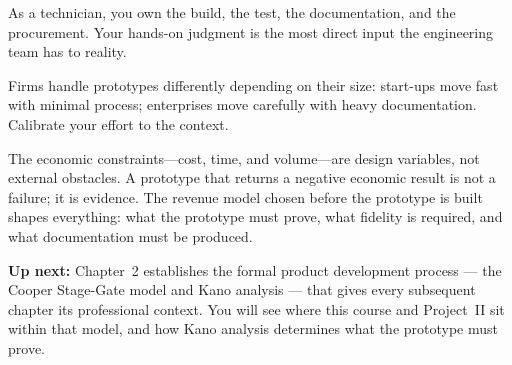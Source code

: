 As a technician, you own the build, the test, the documentation, and the
procurement.
Your hands-on judgment is the most direct input the engineering team has
to reality.

Firms handle prototypes differently depending on their size: start-ups
move fast with minimal process; enterprises move carefully with heavy
documentation.
Calibrate your effort to the context.

The economic constraints---cost, time, and volume---are design variables,
not external obstacles.
A prototype that returns a negative economic result is not a failure; it
is evidence.
The revenue model chosen before the prototype is built shapes everything:
what the prototype must prove, what fidelity is required, and what
documentation must be produced.

\medskip

\noindent\textbf{Up next:} Chapter~2 establishes the formal product development process --- the Cooper Stage-Gate model and Kano analysis --- that gives every subsequent chapter its professional context. You will see where this course and Project~II sit within that model, and how Kano analysis determines what the prototype must prove.

